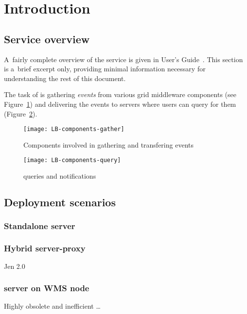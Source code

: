 \section{Introduction}

\subsection{Service overview}

A~fairly complete overview of the \LB service is given in \LB User's Guide~\cite{lbug}.
This section is a~brief excerpt only, providing minimal information necessary for
understanding the rest of this document.

The task of \LB is gathering \emph{\LB events} from various grid middleware components
(see Figure~\ref{f:comp-gather})
and delivering the events to \LB servers where users can query for them
(Figure~\ref{f:comp-query}).

\begin{figure}[ht]
\centering
\texttt{[image: LB-components-gather]}
\caption{Components involved in gathering and transfering \LB events}
\label{f:comp-gather}
\end{figure}

\begin{figure}[ht]
\centering
\texttt{[image: LB-components-query]}
\caption{\LB queries and notifications}
\label{f:comp-query}
\end{figure}




\subsection{Deployment scenarios}



\subsubsection{Standalone \LB server}

\subsubsection{Hybrid \LB server-proxy}

Jen 2.0

\subsubsection{\LB server on WMS node}
Highly obsolete and inefficient \dots
